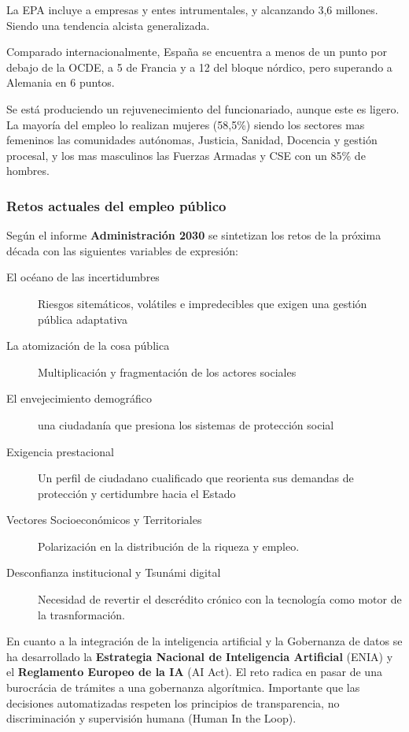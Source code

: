         La EPA incluye a empresas y entes intrumentales, y alcanzando 3,6 millones. Siendo una tendencia alcista generalizada.

        Comparado internacionalmente, España se encuentra a menos de un punto por debajo de la OCDE, a 5 de Francia y a 12 del bloque nórdico, pero superando a Alemania en 6 puntos.

        Se está produciendo un rejuvenecimiento del funcionariado, aunque este es ligero. La mayoría del empleo lo realizan mujeres (58,5\%) siendo los sectores mas femeninos las comunidades autónomas, Justicia, Sanidad, Docencia y gestión procesal, y los mas masculinos las Fuerzas Armadas y CSE con un 85\% de hombres.

    \subsubsection{Retos actuales del empleo público} %
        Según el informe \textbf{Administración 2030} se sintetizan los retos de la próxima década con las siguientes variables de expresión:
        \begin{description}
            \item[El océano de las incertidumbres] Riesgos sitemáticos, volátiles e impredecibles que exigen una gestión pública adaptativa
            \item[La atomización de la cosa pública] Multiplicación y fragmentación de los actores sociales
            \item[El envejecimiento demográfico] una ciudadanía que presiona los sistemas de protección social
            \item[Exigencia prestacional] Un perfil de ciudadano cualificado que reorienta sus demandas de protección y certidumbre hacia el Estado
            \item[Vectores Socioeconómicos y Territoriales] Polarización en la distribución de la riqueza y empleo.
            \item[Desconfianza institucional y Tsunámi digital] Necesidad de revertir el descrédito crónico con la tecnología como motor de la trasnformación.
        \end{description}

        En cuanto a la integración de la inteligencia artificial y la Gobernanza de datos se ha desarrollado la \textbf{Estrategia Nacional de Inteligencia Artificial} (ENIA) y el \textbf{Reglamento Europeo de la IA} (AI Act). El reto radica en pasar de una burocrácia de trámites a una gobernanza algorítmica. Importante que las decisiones automatizadas respeten los principios de transparencia, no discriminación y supervisión humana (Human In the Loop).

